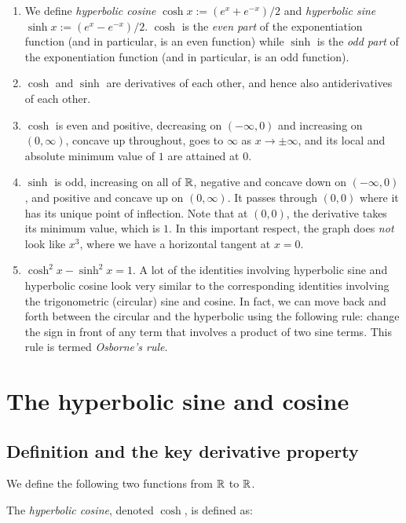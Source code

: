 \documentclass{amsart}
\begin{document}
\begin{enumerate}
\item We define {\em hyperbolic cosine} $\cosh x := (e^x + e^{-x})/2$
  and {\em hyperbolic sine} $\sinh x := (e^x - e^{-x})/2$. $\cosh$ is
  the {\em even part} of the exponentiation function (and in
  particular, is an even function) while $\sinh$ is the {\em odd part}
  of the exponentiation function (and in particular, is an odd
  function).
\item $\cosh$ and $\sinh$ are derivatives of each other, and hence
  also antiderivatives of each other.
\item $\cosh$ is even and positive, decreasing on $(-\infty,0)$ and
  increasing on $(0,\infty)$, concave up throughout, goes to $\infty$
  as $x \to \pm \infty$, and its local and absolute minimum value of
  $1$ are attained at $0$.
\item $\sinh$ is odd, increasing on all of $\mathbb{R}$, negative and concave
  down on $(-\infty,0)$, and positive and concave up on
  $(0,\infty)$. It passes through $(0,0)$ where it has its unique
  point of inflection. Note that at $(0,0)$, the derivative takes its
  minimum value, which is $1$. In this important respect, the graph
  does {\em not} look like $x^3$, where we have a horizontal tangent
  at $x = 0$.
\item $\cosh^2 x - \sinh^2 x = 1$. A lot of the identities involving
  hyperbolic sine and hyperbolic cosine look very similar to the
  corresponding identities involving the trigonometric (circular) sine
  and cosine. In fact, we can move back and forth between the circular
  and the hyperbolic using the following rule: change the sign in
  front of any term that involves a product of two sine terms. This
  rule is termed {\em Osborne's rule}.
\end{enumerate}

\section{The hyperbolic sine and cosine}

\subsection{Definition and the key derivative property}

We define the following two functions from $\mathbb{R}$ to $\mathbb{R}$.

The {\em hyperbolic cosine}, denoted $\cosh$, is defined as:
\end{document}
